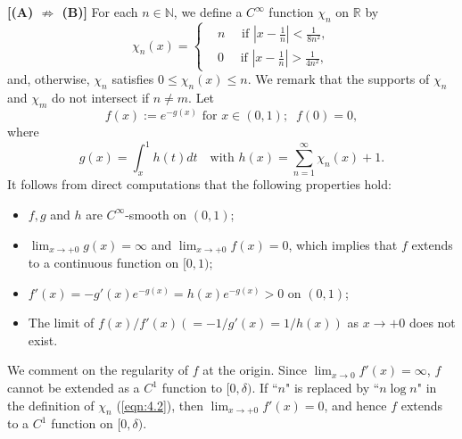 \documentclass[12pt]{amsart}
\numberwithin{equation}{section}
\theoremstyle{definition}
\theoremstyle{remark}
\newcommand{\R}{{\mathbb R}}
\newcommand{\N}{{\mathbb N}}
\newcommand{\1}{{\bf 1}}
\begin{document}
\medskip
{\bf [(A) $\not\Rightarrow$ (B)] }
\quad 
For each $n\in\N$, 
we define a $C^{\infty}$ function 
$\chi_n$ on $\R$ by 
\begin{equation}\label{eqn:4.2}
\chi_n(x)=
\begin{cases}
&n \quad 
\text{ if } \left|x-\frac{1}{n}\right|<\frac{1}{8n^2},\\
&0 \quad
\text{ if } \left|x-\frac{1}{n}\right|>\frac{1}{4n^2},
\end{cases}
\end{equation}
and, otherwise, $\chi_n$ satisfies 
$0\leq \chi_n(x) \leq n$. 
We remark that 
the supports of $\chi_n$ and $\chi_m$ 
do not intersect if $n\neq m$.
Let 
\begin{equation}\label{eqn:4.3}
f(x):=e^{-g(x)} \text{ for } x \in (0,1); \;\;
f(0)=0,  
\end{equation} 
where 
\begin{equation*}
g(x)=\int_x^1 h(t) dt \quad  \text{with }
h(x)= \sum_{n=1}^{\infty} \chi_n(x)+1.
\end{equation*}
It follows from direct computations 
that the following properties hold:
\begin{itemize}
\item $f,g$ and $h$ are $C^{\infty}$-smooth on $(0,1)$;
\item $\lim_{x\to +0}g(x)=\infty$ and 
$\lim_{x\to +0}f(x)=0$, 
which implies that $f$ extends 
to a continuous function on $[0,1)$; 
\item $f'(x)=-g'(x) e^{-g(x)}=h(x) e^{-g(x)}>0$ on $(0,1)$;
\item The limit of 
$f(x)/f'(x)(=-1/g'(x)=1/h(x))$ 
as $x\to+0$ does not exist. 
\end{itemize} 

We comment on the regularity of $f$ at the origin.
Since $\lim_{x\to 0} f'(x)=\infty$, 
$f$ cannot be extended as a $C^1$ function to 
$[0,\delta)$.
If ``$n$" is replaced by ``$n\log n$" 
in the definition of $\chi_n$ (\ref{eqn:4.2}), 
then $\lim_{x\to +0} f'(x)=0$, and hence 
$f$ extends to a $C^1$ function on $[0,\delta)$.
\end{document}
